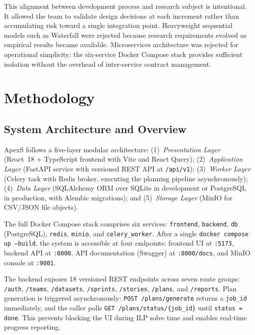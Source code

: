 \documentclass[conference]{IEEEtran}
\begin{document}
This alignment between development process and research subject is intentional.
It allowed the team to validate design decisions at each increment rather than
accumulating risk toward a single integration point.
Heavyweight sequential models such as Waterfall were rejected because research
requirements evolved as empirical results became available.
Microservices architecture was rejected for operational simplicity: the six-service
Docker Compose stack provides sufficient isolation without the overhead of
inter-service contract management.

\section{Methodology}
\label{sec:methodology}

\subsection{System Architecture and Overview}

ApexS follows a five-layer modular architecture: (1)~\emph{Presentation Layer}
(React~18 + TypeScript frontend with Vite and React Query); (2)~\emph{Application
Layer} (FastAPI service with versioned REST API at \texttt{/api/v1}); (3)~\emph{Worker
Layer} (Celery task with Redis broker, executing the planning pipeline
asynchronously); (4)~\emph{Data Layer} (SQLAlchemy ORM over SQLite in development
or PostgreSQL in production, with Alembic migrations); and (5)~\emph{Storage Layer}
(MinIO for CSV/JSON file objects).

The full Docker Compose stack comprises six services: \texttt{frontend},
\texttt{backend}, \texttt{db} (PostgreSQL), \texttt{redis}, \texttt{minio}, and
\texttt{celery\_worker}.
After a single \texttt{docker compose up --build}, the system is accessible at
four endpoints: frontend UI at \texttt{:5173}, backend API at \texttt{:8000}, API
documentation (Swagger) at \texttt{:8000/docs}, and MinIO console at
\texttt{:9001}.

The backend exposes 18 versioned REST endpoints across seven route groups:
\texttt{/auth}, \texttt{/teams}, \texttt{/datasets}, \texttt{/sprints},
\texttt{/stories}, \texttt{/plans}, and \texttt{/reports}.
Plan generation is triggered asynchronously: \texttt{POST /plans/generate} returns
a \texttt{job\_id} immediately, and the caller polls
\texttt{GET /plans/status/\{job\_id\}} until \texttt{status = done}.
This prevents blocking the UI during ILP solve time and enables real-time progress
reporting.
\end{document}
